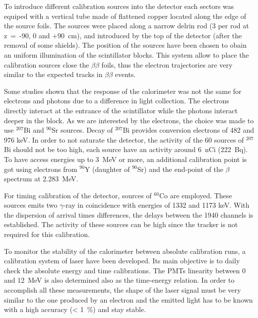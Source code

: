 \documentclass[main.tex]{subfiles}
\begin{document}
\bigskip


\NI To introduce different calibration sources into the detector each sectors was equiped with a vertical tube made of flattened copper located along the edge of the source foils. The sources were placed along a narrow delrin rod (3 per rod at z~=~-90, 0 and +90~cm), and introduced by the top of the detector (after the removal of some shields). The position of the sources have been chosen to obain an uniform illumination of the scintillator blocks. This system allow to place the calibration sources close the $\beta\beta$ foils, thus the electron trajectories are very similar to the expected tracks in $\beta\beta$ events.


\bigskip


\NI Some studies shown that the response of the calorimeter was not the same for electrons and photons due to a difference in light collection. The electrons directly interact at the entrance of the scintillator while the photons interact deeper in the block. As we are interested by the electrons, the choice was made to use $^{\text{207}}$Bi and $^{\text{90}}$Sr sources. Decay of $^{\text{207}}$Bi provides conversion electrons of 482 and 976 keV. In order to not saturate the detector, the activity of the 60 sources of $^{\text{207}}$Bi should not be too high, each source have an activity around 6~nCi (222~Bq). To have access energies up to 3~MeV or more, an additional calibration point is got using electrons from $^{\text{90}}$Y (daughter of $^{\text{90}}$Sr) and the end-point of the $\beta$ spectrum at 2.283~MeV.


\bigskip


\NI For timing calibration of the detector, sources of $^{\text{60}}$Co are employed. These sources emits two $\gamma$-ray in  coincidence with energies of 1332 and 1173 keV. With the dispersion of arrival times differences, the delays between the 1940 channels is established. The activity of these sources can be high since the tracker is not required for this calibration.


\bigskip


\NI To monitor the stability of the calorimeter between absolute calibration runs, a calibration system of laser have been developed. Its main objective is to daily check the absolute energy and time calibrations. The PMTs linearity between 0 and 12~MeV is also determined also as the time-energy relation. In order to accomplish all these measurements, the shape of the laser signal must be very similar to the one produced by an electron and the emitted light has to be known with a high accuracy (< 1~\%) and stay stable. 
\end{document}
